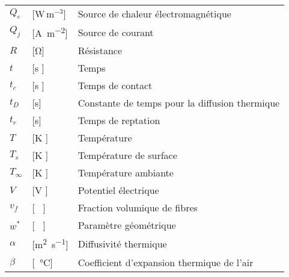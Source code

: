 \begin{longtable}{l p{2.5cm} p{4in}}
	$Q_e$             & [W\,m$^{-3}$]                                       & Source de chaleur électromagnétique                          \\
	$Q_j$             & [\si{\ampere\per\square\metre}]                     & Source de courant                                            \\
	$R$               & [\si{\ohm}]                                         & Résistance                                                   \\
	$t$               & [\si{\second} ]                                     & Temps                                                        \\
	$t_c$             & [\si{\second} ]                                     & Temps de contact                                             \\
	$t_D$             & [\si{\second}]                                      & Constante de temps pour la diffusion thermique               \\
	$t_r$             & [\si{\second}]                                      & Temps de reptation                                           \\
	$T$               & [\si{\kelvin} ]                                     & Température                                                  \\
	$T_s$             & [\si{\kelvin} ]                                     & Température de surface                                       \\
	$T_{\infty}$      & [\si{\kelvin} ]                                     & Température ambiante                                         \\
	$V$               & [\si{\volt} ]                                       & Potentiel électrique                                         \\
	$v_f$             & [ \ ]                                               & Fraction volumique de fibres                                 \\
	$w^*$             & [ \ ]                                               & Paramètre géométrique                                        \\
	$\alpha$          & [\si{\square\metre\per\second}]                     & Diffusivité thermique                                        \\
	$\beta$           & [\si{\per\celsius}]                                 & Coefficient d'expansion thermique de l'air                   \\

\end{longtable}
